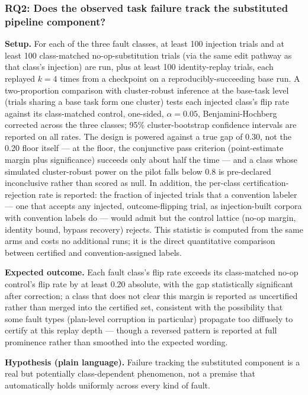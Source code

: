 \documentclass[11pt]{article}
\begin{document}
\subsubsection{RQ2: Does the observed task failure track the substituted pipeline component?}
\textbf{Setup.} For each of the three fault classes, at least 100 injection trials and at least 100 class-matched no-op-substitution trials (via the same edit pathway as that class's injection) are run, plus at least 100 identity-replay trials, each replayed $k = 4$ times from a checkpoint on a reproducibly-succeeding base run. A two-proportion comparison with cluster-robust inference at the base-task level (trials sharing a base task form one cluster) tests each injected class's flip rate against its class-matched control, one-sided, $\alpha = 0.05$, Benjamini-Hochberg corrected across the three classes; 95\% cluster-bootstrap confidence intervals are reported on all rates. The design is powered against a true gap of 0.30, not the 0.20 floor itself --- at the floor, the conjunctive pass criterion (point-estimate margin plus significance) succeeds only about half the time --- and a class whose simulated cluster-robust power on the pilot falls below 0.8 is pre-declared inconclusive rather than scored as null. In addition, the per-class certification-rejection rate is reported: the fraction of injected trials that a convention labeler --- one that accepts any injected, outcome-flipping trial, as injection-built corpora with convention labels do --- would admit but the control lattice (no-op margin, identity bound, bypass recovery) rejects. This statistic is computed from the same arms and costs no additional runs; it is the direct quantitative comparison between certified and convention-assigned labels.

\textbf{Expected outcome.} Each fault class's flip rate exceeds its class-matched no-op control's flip rate by at least 0.20 absolute, with the gap statistically significant after correction; a class that does not clear this margin is reported as uncertified rather than merged into the certified set, consistent with the possibility that some fault types (plan-level corruption in particular) propagate too diffusely to certify at this replay depth --- though a reversed pattern is reported at full prominence rather than smoothed into the expected wording.

\textbf{Hypothesis (plain language).} Failure tracking the substituted component is a real but potentially class-dependent phenomenon, not a premise that automatically holds uniformly across every kind of fault.
\end{document}
